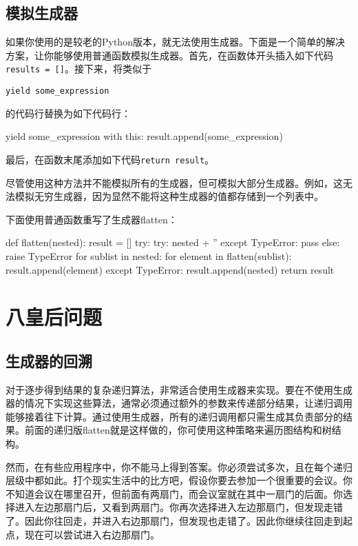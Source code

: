 \subsection{模拟生成器}
如果你使用的是较老的Python版本，就无法使用生成器。下面是一个简单的解决方案，让你能够使用普通函数模拟生成器。首先，在函数体开头插入如下代码\verb|results = []|。接下来，将类似于

\verb|yield some_expression|

的代码行替换为如下代码行：
\begin{pyc}
yield some_expression with this:
result.append(some_expression)
\end{pyc}
最后，在函数末尾添加如下代码\verb|return result|。

尽管使用这种方法并不能模拟所有的生成器，但可模拟大部分生成器。例如，这无法模拟无穷生成器，因为显然不能将这种生成器的值都存储到一个列表中。

下面使用普通函数重写了生成器flatten：
\begin{pyc}
def flatten(nested):
    result = []
    try:
        try:
            nested + ''
        except TypeError:
            pass
        else:
            raise TypeError
        for sublist in nested:
            for element in flatten(sublist):
                result.append(element)
    except TypeError:
        result.append(nested)
    return result
\end{pyc}
\section{八皇后问题}
\subsection{生成器的回溯}
对于逐步得到结果的复杂递归算法，非常适合使用生成器来实现。要在不使用生成器的情况下实现这些算法，通常必须通过额外的参数来传递部分结果，让递归调用能够接着往下计算。通过使用生成器，所有的递归调用都只需生成其负责部分的结果。前面的递归版flatten就是这样做的，你可使用这种策略来遍历图结构和树结构。

然而，在有些应用程序中，你不能马上得到答案。你必须尝试多次，且在每个递归层级中都如此。打个现实生活中的比方吧，假设你要去参加一个很重要的会议。你不知道会议在哪里召开，但前面有两扇门，而会议室就在其中一扇门的后面。你选择进入左边那扇门后，又看到两扇门。你再次选择进入左边那扇门，但发现走错了。因此你往回走，并进入右边那扇门，但发现也走错了。因此你继续往回走到起点，现在可以尝试进入右边那扇门。

